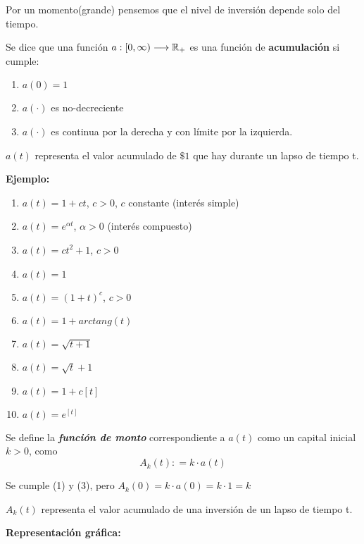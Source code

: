 Por un momento(grande) pensemos que el nivel de inversión depende solo del tiempo.

\begin{definition}
Se dice que una función $a:\left[ 0,\infty \right) \longrightarrow \mathbb R_+ $ es una función de \textbf{acumulación} si cumple:

\begin{enumerate}
\item  $a(0) = 1$
\item $a\left(\cdot\right)$ es no-decreciente
\item $a(\cdot)$ es continua por la derecha y con límite por la izquierda.
\end{enumerate}
\end{definition}

$a(t)$ representa el valor acumulado de $\$1$ que hay durante un lapso de tiempo t.

\newpage

\textbf{Ejemplo:}
\begin{enumerate}
\item $a(t) = 1+ct$, $c>0$, $c$ constante (interés simple)
\item $a(t) = e^{\alpha t}$, $\alpha > 0$ (interés compuesto)
\item $a(t) = ct^2 + 1$, $c>0$
\item $a(t) = 1$
\item $a(t) = (1+t)^c$, $c>0$
\item $a(t) = 1 + arctang(t)$
\item $a(t) = \sqrt{t+1}$
\item $a(t) = \sqrt{t} + 1$
\item $a(t) = 1 + c\left[ t \right]$
\item $a(t) = e^{\left[ t \right]}$
\end{enumerate}

\begin{definition}
Se define la \emph{\textbf{función de monto}} correspondiente a $a(t)$ como un capital inicial $k>0$, como 
$$ A_k \left( t \right) : = k \cdot a \left( t\right)  $$
\end{definition}

\begin{remark}
Se cumple (1) y (3), pero $A_k(0) = k \cdot a(0) = k \cdot 1 = k$
\end{remark}

$A_k(t)$ representa el valor acumulado de una inversión de un lapso de tiempo t.

\textbf{Representación gráfica:}


